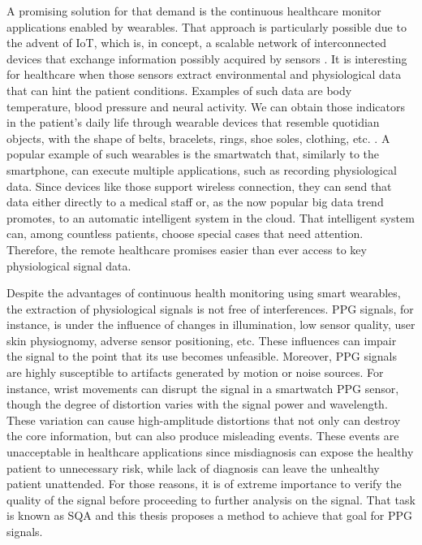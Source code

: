 A promising solution for that demand is the continuous healthcare monitor applications enabled by wearables. That approach is particularly possible due to the advent of \gls{IoT}, which is, in concept, a scalable network of interconnected devices that exchange information possibly acquired by sensors \cite{aouedi2024survey}. It is interesting for healthcare when those sensors extract environmental and physiological data that can hint the patient conditions. Examples of such data are body temperature, blood pressure and neural activity. We can obtain those indicators in the patient's daily life through wearable devices that resemble quotidian objects, with the shape of belts, bracelets, rings, shoe soles, clothing, etc. \cite{van2024smart}. A popular example of such wearables is the smartwatch that, similarly to the smartphone, can execute multiple applications, such as recording physiological data. Since devices like those support wireless connection, they can send that data either directly to a medical staff or, as the now popular big data trend promotes, to an automatic intelligent system in the cloud. That intelligent system can, among countless patients, choose special cases that need attention. Therefore, the remote healthcare promises easier than ever access to key physiological signal data. 

Despite the advantages of continuous health monitoring using smart wearables, the extraction of physiological signals is not free of interferences. \Gls{PPG} signals, for instance, is under the influence of changes in illumination, low sensor quality, user skin physiognomy, adverse sensor positioning, etc. These influences can impair the signal to the point that its use becomes unfeasible. Moreover, \gls{PPG} signals are highly susceptible to artifacts generated by motion or noise sources. For instance, wrist movements can disrupt the signal in a smartwatch \gls{PPG} sensor, though the degree of distortion varies with the signal power and wavelength. These variation can cause high-amplitude distortions that not only can destroy the core information, but can also produce misleading events. These events are unacceptable in healthcare applications since misdiagnosis can expose the healthy patient to unnecessary risk, while lack of diagnosis can leave the unhealthy patient unattended. For those reasons, it is of extreme importance to verify the quality of the signal before proceeding to further analysis on the signal. That task is known as \gls{SQA} and this thesis proposes a method to achieve that goal for \gls{PPG} signals.


